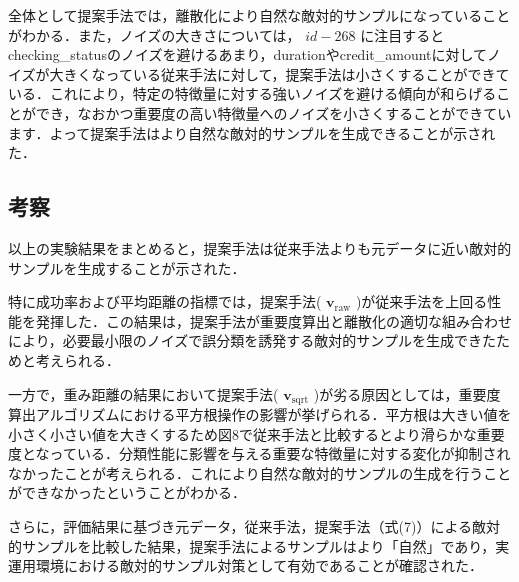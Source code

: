 全体として提案手法では，離散化により自然な敵対的サンプルになっていることがわかる．また，ノイズの大きさについては， $id-268$ に注目するとchecking\_statusのノイズを避けるあまり，durationやcredit\_amountに対してノイズが大きくなっている従来手法に対して，提案手法は小さくすることができている．これにより，特定の特徴量に対する強いノイズを避ける傾向が和らげることができ，なおかつ重要度の高い特徴量へのノイズを小さくすることができています．よって提案手法はより自然な敵対的サンプルを生成できることが示された．

\subsection{考察}
以上の実験結果をまとめると，提案手法は従来手法よりも元データに近い敵対的サンプルを生成することが示された．

特に成功率および平均距離の指標では，提案手法( $\bm{v}_{\mathrm{raw}}$ )が従来手法を上回る性能を発揮した．この結果は，提案手法が重要度算出と離散化の適切な組み合わせにより，必要最小限のノイズで誤分類を誘発する敵対的サンプルを生成できたためと考えられる．

一方で，重み距離の結果において提案手法( $\bm{v}_{\mathrm{sqrt}}$ )が劣る原因としては，重要度算出アルゴリズムにおける平方根操作の影響が挙げられる．平方根は大きい値を小さく小さい値を大きくするため図8で従来手法と比較するとより滑らかな重要度となっている．分類性能に影響を与える重要な特徴量に対する変化が抑制されなかったことが考えられる．これにより自然な敵対的サンプルの生成を行うことができなかったということがわかる．

さらに，評価結果に基づき元データ，従来手法，提案手法（式(7)）による敵対的サンプルを比較した結果，提案手法によるサンプルはより「自然」であり，実運用環境における敵対的サンプル対策として有効であることが確認された．

